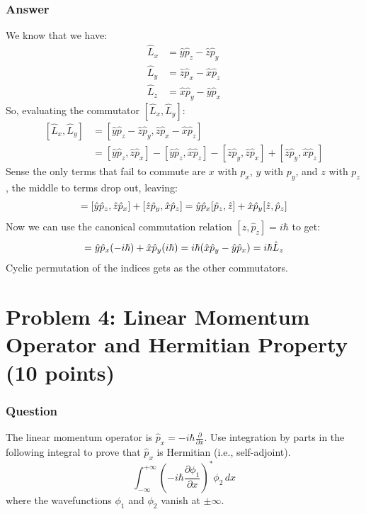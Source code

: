 \documentclass{article}
\begin{document}
\subsubsection{Answer}
We know that we have:
\begin{align*}
    \hat{L}_x &= \hat{y}\hat{p}_z - \hat{z}\hat{p}_y \\
    \hat{L}_y &= \hat{z}\hat{p}_x - \hat{x}\hat{p}_z \\
    \hat{L}_z &= \hat{x}\hat{p}_y - \hat{y}\hat{p}_x
\end{align*}
So, evaluating the commutator $[\hat{L}_x, \hat{L}_y]$:
\begin{equation}
    \begin{split}
        [\hat{L}_x, \hat{L}_y] &= [\hat{y}\hat{p}_z - \hat{z}\hat{p}_y, \hat{z}\hat{p}_x - \hat{x}\hat{p}_z] \\
        &= [\hat{y}\hat{p}_z, \hat{z}\hat{p}_x] - [\hat{y}\hat{p}_z, \hat{x}\hat{p}_z] - [\hat{z}\hat{p}_y, \hat{z}\hat{p}_x] + [\hat{z}\hat{p}_y, \hat{x}\hat{p}_z]
    \end{split}
\end{equation}
Sense the only terms that fail to commute are $x$ with $p_x$, $y$ with $p_y$, and $z$ with $p_z$, the middle to terms drop out, leaving:
\begin{equation}
    = [\hat{y}\hat{p}_z, \hat{z}\hat{p}_x] + [\hat{z}\hat{p}_y, \hat{x}\hat{p}_z]\\
= \hat{y}\hat{p}_x[\hat{p}_z, \hat{z}] + \hat{x}\hat{p}_y[\hat{z}, \hat{p}_z]\\
\end{equation}
Now we can use the canonical commutation relation $[\hat{z}, \hat{p}_z] = i\hbar$ to get:
\begin{equation}
    = \hat{y}\hat{p}_x(-i\hbar) + \hat{x}\hat{p}_y(i\hbar)\\
= i\hbar(\hat{x}\hat{p}_y - \hat{y}\hat{p}_x)\\
= i\hbar\hat{L}_z
\end{equation}
Cyclic permutation of the indices gets as the other commutators.




\section{Problem 4: Linear Momentum Operator and Hermitian Property (10 points)}
\subsubsection{Question}
The linear momentum operator is $\hat{p}_x = -i\hbar \frac{\partial}{\partial x}$. Use integration by parts in the following integral to prove that $\hat{p}_x$ is Hermitian (i.e., self-adjoint).
\begin{equation*}
    \int_{-\infty}^{+\infty} \left(-i\hbar \frac{\partial \phi_1}{\partial x}\right)^* \phi_2 \, dx
\end{equation*}
where the wavefunctions $\phi_1$ and $\phi_2$ vanish at $\pm\infty$.
\end{document}
